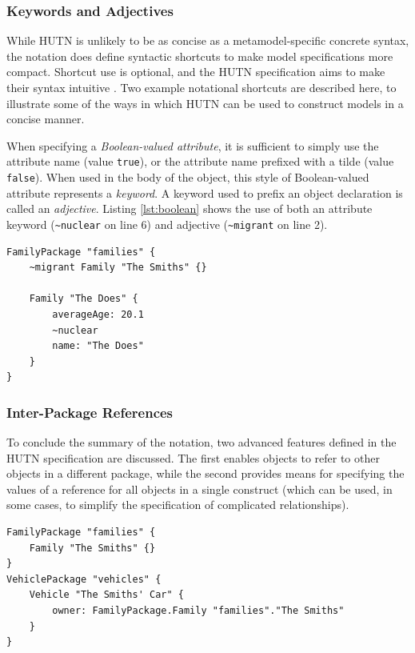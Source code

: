 \subsubsection{Keywords and Adjectives}
While HUTN is unlikely to be as concise as a metamodel-specific concrete syntax, the notation does define syntactic shortcuts to make model specifications more compact. Shortcut use is optional, and the HUTN specification aims to make their syntax intuitive \cite[pg2-4]{hutn}. Two example notational shortcuts are described here, to illustrate some of the ways in which HUTN can be used to construct models in a concise manner.

When specifying a \emph{Boolean-valued attribute}, it is sufficient to simply use the attribute name (value \texttt{true}), or the attribute name prefixed with a tilde (value \texttt{false}). When used in the body of the object, this style of Boolean-valued attribute represents a \emph{keyword}. A keyword used to prefix an object declaration is called an \emph{adjective}. Listing \ref{lst:boolean} shows the use of both an attribute keyword (\texttt{\textasciitilde nuclear} on line 6) and adjective (\texttt{\textasciitilde migrant} on line 2).

\begin{lstlisting}[caption=Using keywords and adjectives in HUTN., label=lst:boolean, language=HutnFamilies]
FamilyPackage "families" {
    ~migrant Family "The Smiths" {}

    Family "The Does" {
        averageAge: 20.1
        ~nuclear
        name: "The Does"
    }
}
\end{lstlisting}


\subsubsection{Inter-Package References}
\label{subsubsec:inter-package_references}
To conclude the summary of the notation, two advanced features defined in the HUTN specification are discussed. The first enables objects to refer to other objects in a different package, while the second provides means for specifying the values of a reference for all objects in a single construct (which can be used, in some cases, to simplify the specification of complicated relationships).

\begin{lstlisting}[caption=Referencing objects in other packages with HUTN., label=lst:fullyqualified, language=HutnFamilies]
FamilyPackage "families" {
    Family "The Smiths" {}
}
VehiclePackage "vehicles" {
    Vehicle "The Smiths' Car" {
        owner: FamilyPackage.Family "families"."The Smiths"
    }
}
\end{lstlisting}

